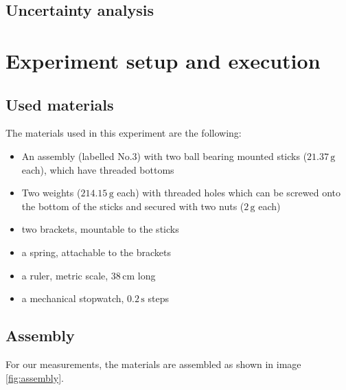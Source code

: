 \documentclass{scrreprt}
\newcommand{\unit}[1]{\ensuremath{\, \mathrm{#1}}}
\begin{document}
\subsection{Uncertainty analysis}

\section{Experiment setup and execution}

\subsection{Used materials}
The materials used in this experiment are the following:
\begin{itemize}
\item An assembly (labelled No.$3$) with two ball bearing mounted sticks ($21.37\unit{g}$ each), which have threaded bottoms
\item Two weights ($214.15 \unit{g}$ each) with threaded holes which can be screwed onto the bottom of the sticks and secured with two nuts ($2\unit{g}$ each)
\item two brackets, mountable to the sticks
\item a spring, attachable to the brackets 
\item a ruler, metric scale, $38 \unit{cm}$ long
\item a mechanical stopwatch, $0.2 \unit{s}$ steps
\end{itemize}

\subsection{Assembly}
For our measurements, the materials are assembled as shown in image \ref{fig:assembly}.
\end{document}
